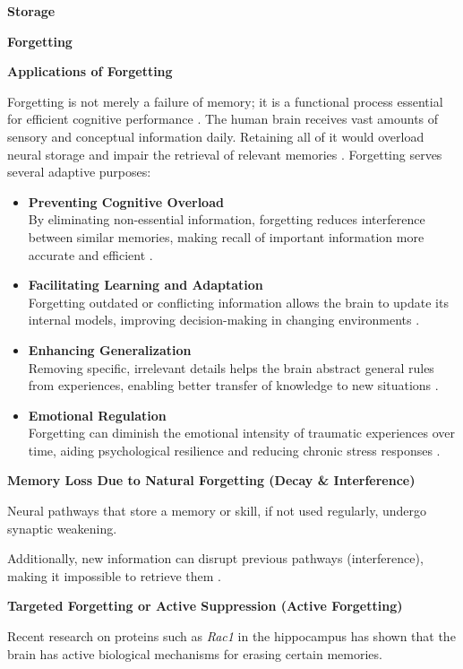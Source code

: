 \documentclass{book}
\providecommand{\ProjectDeepHeading}[2]{%
    \par\medskip\noindent\textbf{#2}\par\smallskip
}
\begin{document}
    \ProjectDeepHeading{7}{Storage}

    \ProjectDeepHeading{7}{Forgetting}
        \ProjectDeepHeading{8}{Applications of Forgetting}
        Forgetting is not merely a failure of memory; it is a functional process essential for efficient cognitive performance \cite{hardt-2013-decay-happens}.
        The human brain receives vast amounts of sensory and conceptual information daily.
        Retaining all of it would overload neural storage and impair the retrieval of relevant memories .
        Forgetting serves several adaptive purposes:

        \begin{itemize}
            \item \textbf{Preventing Cognitive Overload} \\
                By eliminating non-essential information, forgetting reduces interference between similar memories, making recall of important information more accurate and efficient .
            \item \textbf{Facilitating Learning and Adaptation} \\
                Forgetting outdated or conflicting information allows the brain to update its internal models, improving decision-making in changing environments .
            \item \textbf{Enhancing Generalization} \\
                Removing specific, irrelevant details helps the brain abstract general rules from experiences, enabling better transfer of knowledge to new situations .
            \item \textbf{Emotional Regulation} \\
                Forgetting can diminish the emotional intensity of traumatic experiences over time, aiding psychological resilience and reducing chronic stress responses .
        \end{itemize}

        \ProjectDeepHeading{8}{Memory Loss Due to Natural Forgetting (Decay \& Interference)}
        Neural pathways that store a memory or skill, if not used regularly, undergo synaptic weakening.

        Additionally, new information can disrupt previous pathways (interference), making it impossible to retrieve them .

        \ProjectDeepHeading{8}{Targeted Forgetting or Active Suppression (Active Forgetting)}
        Recent research on proteins such as \textit{Rac1} in the hippocampus has shown that the brain has active biological mechanisms for erasing certain memories.
\end{document}
